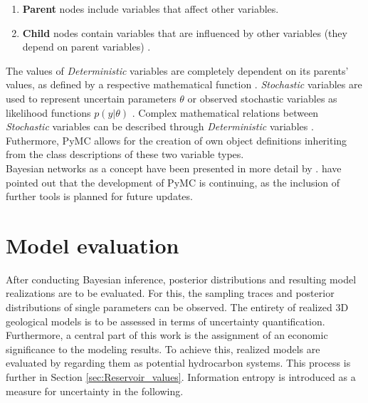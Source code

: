 		\begin{enumerate}
			\item \textbf{Parent} nodes include variables that affect other variables.
			\item \textbf{Child} nodes contain variables that are influenced by other variables (they depend on parent variables) \citep{delaVarga2016}.
		\end{enumerate}
		The values of \textit{Deterministic} variables are completely dependent on its parents' values, as defined by a respective mathematical function \citep{salvatier2016pymc3}. \textit{Stochastic} variables are used to represent uncertain parameters $\theta$ or observed stochastic variables as likelihood functions $p(y|\theta)$ \citep{salvatier2016pymc3, delaVarga2016}. Complex mathematical relations between \textit{Stochastic} variables can be described through \textit{Deterministic} variables \citep{delaVarga2016}. Futhermore, PyMC allows for the creation of own object definitions inheriting from the class descriptions of these two variable types.\\
		Bayesian networks as a concept have been presented in more detail by \citet{koller2009probabilistic}. \citet{salvatier2016pymc3} have pointed out that the development of PyMC is continuing, as the inclusion of further tools is planned for future updates.
		
		
		\section{Model evaluation}\label{sec:model_evaluation}
        After conducting Bayesian inference, posterior distributions and resulting model realizations are to be evaluated. For this, the sampling traces and posterior distributions of single parameters can be observed. The entirety of realized 3D geological models is to be assessed in terms of uncertainty quantification. Furthermore, a central part of this work is the assignment of an economic significance to the modeling results. To achieve this, realized models are evaluated by regarding them as potential hydrocarbon systems. This process is further in Section \ref{sec:Reservoir_values}. Information entropy is introduced as a measure for uncertainty in the following.
        
